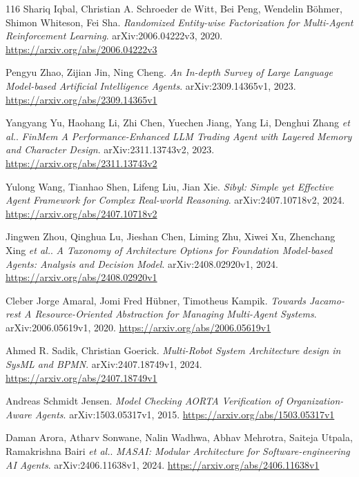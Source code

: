 \documentclass[11pt,a4paper]{article}
\begin{document}
\begin{thebibliography}{116}
Shariq Iqbal, Christian A. Schroeder de Witt, Bei Peng, Wendelin B\"{o}hmer, Shimon Whiteson, Fei Sha.
\newblock \emph{Randomized Entity-wise Factorization for Multi-Agent Reinforcement Learning}.
\newblock arXiv:2006.04222v3, 2020.
\newblock \url{https://arxiv.org/abs/2006.04222v3}

Pengyu Zhao, Zijian Jin, Ning Cheng.
\newblock \emph{An In-depth Survey of Large Language Model-based Artificial Intelligence Agents}.
\newblock arXiv:2309.14365v1, 2023.
\newblock \url{https://arxiv.org/abs/2309.14365v1}

Yangyang Yu, Haohang Li, Zhi Chen, Yuechen Jiang, Yang Li, Denghui Zhang \emph{et al.}.
\newblock \emph{FinMem A Performance-Enhanced LLM Trading Agent with Layered Memory and Character Design}.
\newblock arXiv:2311.13743v2, 2023.
\newblock \url{https://arxiv.org/abs/2311.13743v2}

Yulong Wang, Tianhao Shen, Lifeng Liu, Jian Xie.
\newblock \emph{Sibyl: Simple yet Effective Agent Framework for Complex Real-world Reasoning}.
\newblock arXiv:2407.10718v2, 2024.
\newblock \url{https://arxiv.org/abs/2407.10718v2}

Jingwen Zhou, Qinghua Lu, Jieshan Chen, Liming Zhu, Xiwei Xu, Zhenchang Xing \emph{et al.}.
\newblock \emph{A Taxonomy of Architecture Options for Foundation Model-based Agents: Analysis and Decision Model}.
\newblock arXiv:2408.02920v1, 2024.
\newblock \url{https://arxiv.org/abs/2408.02920v1}

Cleber Jorge Amaral, Jomi Fred H\"{u}bner, Timotheus Kampik.
\newblock \emph{Towards Jacamo-rest A Resource-Oriented Abstraction for Managing Multi-Agent Systems}.
\newblock arXiv:2006.05619v1, 2020.
\newblock \url{https://arxiv.org/abs/2006.05619v1}

Ahmed R. Sadik, Christian Goerick.
\newblock \emph{Multi-Robot System Architecture design in SysML and BPMN}.
\newblock arXiv:2407.18749v1, 2024.
\newblock \url{https://arxiv.org/abs/2407.18749v1}

Andreas Schmidt Jensen.
\newblock \emph{Model Checking AORTA Verification of Organization-Aware Agents}.
\newblock arXiv:1503.05317v1, 2015.
\newblock \url{https://arxiv.org/abs/1503.05317v1}

Daman Arora, Atharv Sonwane, Nalin Wadhwa, Abhav Mehrotra, Saiteja Utpala, Ramakrishna Bairi \emph{et al.}.
\newblock \emph{MASAI: Modular Architecture for Software-engineering AI Agents}.
\newblock arXiv:2406.11638v1, 2024.
\newblock \url{https://arxiv.org/abs/2406.11638v1}


\end{thebibliography}
\end{document}
